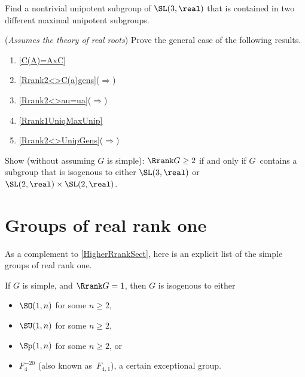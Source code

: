 \begin{exercises}
\item \label{Rrank1UniqMaxUnipEx}
Find a nontrivial unipotent subgroup of $\SL(3,\real)$ that is contained in two different maximal unipotent subgroups.

\item (\emph{Assumes the theory of real roots})
Prove the general case of the following results.
	\begin{enumerate}
	\item \cref{C(A)=AxC}
	\item \cref{Rrank2<>C(a)gens}($\Rightarrow$)
	\item \cref{Rrank2<>au=ua}($\Rightarrow$)
	\item \cref{Rrank1UniqMaxUnip}
	\item \cref{Rrank2<>UnipGens}($\Rightarrow$)
	\end{enumerate}

\item Show (without assuming $G$ is simple): $\Rrank G \ge 2$ if and only if $G$~contains a subgroup that is isogenous to either $\SL(3,\real)$ or $\SL(2,\real) \times \SL(2,\real)$.


 \end{exercises}








\section{Groups of real rank one}

As a complement to \cref{HigherRrankSect}, here is an explicit list of the simple groups of real rank one.

\begin{thm} \label{rank1simple}
 If $G$ is simple, and\/ $\Rrank G = 1$, then $G$ is isogenous to
either
 \begin{itemize}
 \item $\SO(1,n)$ for some $n \ge 2$,
 \item $\SU(1,n)$ for some $n \ge 2$,
 \item $\Sp(1,n)$ for some $n \ge 2$, or
 \item $F_4^{-20}$ \textup(also known as~$F_{4,1}$\textup), a certain exceptional group.
 \end{itemize}
 \end{thm}

